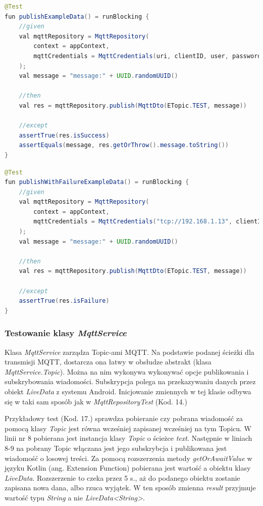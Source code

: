 \begin{lstlisting}[language=Java, caption=Test publikowania losowej wiadmości MQTT]
@Test
fun publishExampleData() = runBlocking {
    //given
    val mqttRepository = MqttRepository(
        context = appContext,
        mqttCredentials = MqttCredentials(uri, clientID, user, password)
    );
    val message = "message:" + UUID.randomUUID()

    //then
    val res = mqttRepository.publish(MqttDto(ETopic.TEST, message))

    //except
    assertTrue(res.isSuccess)
    assertEquals(message, res.getOrThrow().message.toString())
}
\end{lstlisting}

\begin{lstlisting}[language=Java, caption=Test publikowania wiadomości na nieistniejący broker MQTT]
@Test
fun publishWithFailureExampleData() = runBlocking {
    //given
    val mqttRepository = MqttRepository(
        context = appContext,
        mqttCredentials = MqttCredentials("tcp://192.168.1.13", clientID, user, password)
    );
    val message = "message:" + UUID.randomUUID()

    //then
    val res = mqttRepository.publish(MqttDto(ETopic.TEST, message))

    //except
    assertTrue(res.isFailure)
}
\end{lstlisting}



\subsubsection{Testowanie klasy \textit{MqttService}}


Klasa \textit{MqttService} zarządza Topic-ami MQTT. Na podstawie podanej ścieżki dla transmisji MQTT, dostarcza ona łatwy w obsłudze abstrakt (klasa \textit{MqttService.Topic}). Można na nim wykonywa wykonywać opcje publikowania i subskrybowania wiadomości. Subskrypcja polega na przekazywaniu danych przez obiekt \textit{LiveData} z systemu Android. Inicjowanie zmiennych w tej klasie odbywa się w taki sam sposób jak w \textit{MqttRepositoryTest} (Kod. 14.)

Przykładowy test (Kod. 17.) sprawdza pobieranie czy pobrana wiadomość za pomocą klasy \textit{Topic} jest równa wcześniej zapisanej wcześniej na tym Topicu. W linii nr 8 pobierana jest instancja klasy \textit{Topic} o ścieżce \textit{text}. Następnie w liniach 8-9 na pobrany Topic włączana jest jego subskrybcja i publikowana jest wiadomość o losowej treści. Za pomocą rozszerzenia metody \textit{getOrAwaitValue} w języku Kotlin (ang. Extension Function) pobierana jest wartość a obiektu klasy \textit{LiveData}. Rozszerzenie to czeka przez 5 s., aż do podanego obiektu zostanie zapisana nowa dana, albo rzuca wyjątek. W ten sposób zmienna \textit{result} przyjmuje wartość typu \textit{String} a nie \textit{LiveData<String>}.


